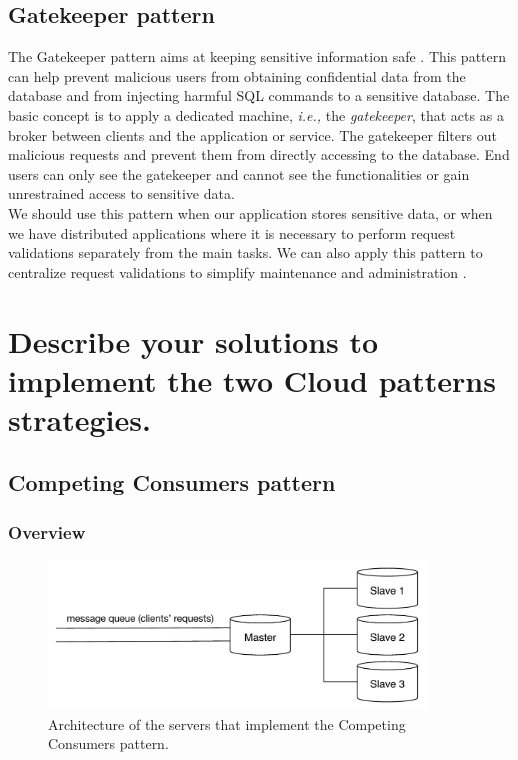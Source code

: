 \documentclass{article}
\begin{document}
\subsection{Gatekeeper pattern}
The Gatekeeper pattern aims at keeping sensitive information safe \cite{homer2014cloud}. This pattern can help prevent malicious users from obtaining confidential data from the database and from injecting harmful SQL commands to a sensitive database. The basic concept is to apply a dedicated machine, \emph{i.e.,} the \emph{gatekeeper}, that acts as a broker between clients and the application or service. The gatekeeper filters out malicious requests and prevent them from directly accessing to the database. End users can only see the gatekeeper and cannot see the functionalities or gain unrestrained access to sensitive data. \\

We should use this pattern when our application stores sensitive data,
or when we have distributed applications where it is necessary to perform request validations separately from the main tasks. We can also apply this pattern to centralize request validations to simplify maintenance and administration \cite{homer2014cloud}.


\section{Describe your solutions to implement the two Cloud patterns strategies.}\label{Q3}
\subsection{Competing Consumers pattern}
\subsubsection{Overview}

\begin{figure}[t]
    \centering
        \includegraphics[width = 10cm]{images/CCP.pdf}
    \caption{Architecture of the servers that implement the Competing Consumers pattern.}
    \label{fig:arch1}
\end{figure}
\end{document}
